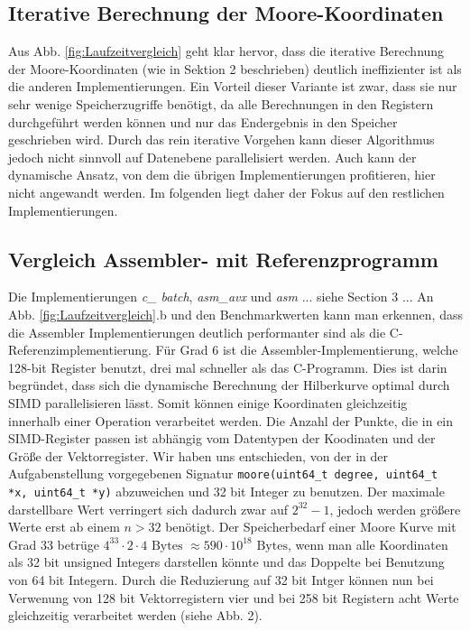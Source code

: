 \documentclass[course=erap]{aspdoc}
\begin{document}
 \subsection{Iterative Berechnung der Moore-Koordinaten}
Aus Abb. \ref{fig:Laufzeitvergleich} geht klar hervor, dass die iterative Berechnung der Moore-Koordinaten (wie in Sektion 2 beschrieben) deutlich ineffizienter ist als die anderen Implementierungen. Ein Vorteil dieser Variante ist zwar, dass sie nur sehr wenige Speicherzugriffe benötigt, da alle Berechnungen in den Registern durchgeführt werden können und nur das Endergebnis in den Speicher geschrieben wird. Durch das rein iterative Vorgehen kann dieser Algorithmus jedoch nicht sinnvoll auf Datenebene parallelisiert werden. Auch kann der dynamische Ansatz, von dem die übrigen Implementierungen profitieren, hier nicht angewandt werden. Im folgenden liegt daher der Fokus auf den restlichen Implementierungen.

\subsection{Vergleich Assembler- mit Referenzprogramm}
Die Implementierungen \textit{c\_ batch}, \textit{asm\_avx} und \textit{asm} ... siehe Section 3 ... \newline
An Abb. \ref{fig:Laufzeitvergleich}.b und den Benchmarkwerten kann man erkennen, dass die Assembler Implementierungen deutlich performanter sind als die C-Referenzimplementierung. Für Grad 6 ist die Assembler-Implementierung, welche 128-bit Register benutzt, drei mal schneller als das C-Programm. Dies ist darin begründet, dass sich die dynamische Berechnung der Hilberkurve optimal durch SIMD parallelisieren lässt. Somit können einige Koordinaten gleichzeitig innerhalb einer Operation verarbeitet werden. Die Anzahl der Punkte, die in ein SIMD-Register passen ist abhängig vom Datentypen der Koodinaten und der Größe der Vektorregister. Wir haben uns entschieden, von der in der Aufgabenstellung vorgegebenen Signatur \texttt{moore(uint64\_t degree, uint64\_t *x, uint64\_t *y)} abzuweichen und 32 bit Integer zu benutzen. Der maximale darstellbare Wert verringert sich dadurch zwar auf $2^{32}-1$, jedoch werden größere Werte erst ab einem $n > 32$ benötigt. Der Speicherbedarf einer Moore Kurve mit Grad 33 betrüge $4^{33} \cdot 2 \cdot 4 \text{ Bytes } \approx 590 \cdot 10^{18} \text{ Bytes}$, wenn man alle Koordinaten als 32 bit unsigned Integers darstellen könnte und das Doppelte bei Benutzung von 64 bit Integern. 
\newline
Durch die Reduzierung auf 32 bit Intger können nun bei Verwenung von 128 bit Vektorregistern vier und bei 258 bit Registern acht Werte gleichzeitig verarbeitet werden (siehe Abb. 2).
\end{document}

